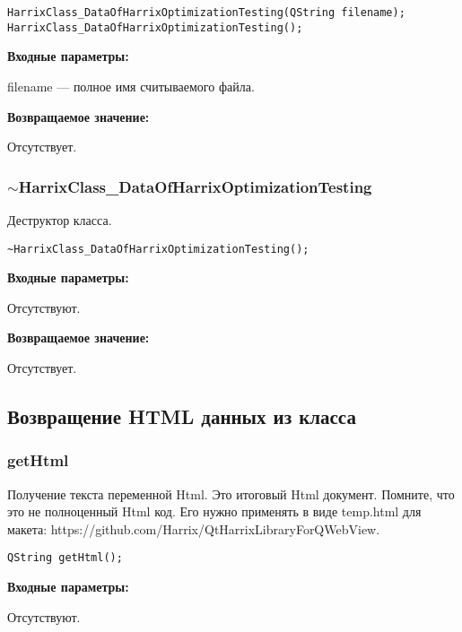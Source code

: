 \begin{lstlisting}[label=code_syntax_HarrixClass_DataOfHarrixOptimizationTesting,caption=Синтаксис]
HarrixClass_DataOfHarrixOptimizationTesting(QString filename);
HarrixClass_DataOfHarrixOptimizationTesting();
\end{lstlisting}

\textbf{Входные параметры:}

filename --- полное имя считываемого файла.

\textbf{Возвращаемое значение:}

Отсутствует.


\subsubsection{$\sim$HarrixClass\_DataOfHarrixOptimizationTesting}\label{tildaHarrixClass_DataOfHarrixOptimizationTesting}

Деструктор класса.


\begin{lstlisting}[label=code_syntax_tildaHarrixClass_DataOfHarrixOptimizationTesting,caption=Синтаксис]
~HarrixClass_DataOfHarrixOptimizationTesting();
\end{lstlisting}

\textbf{Входные параметры:}

Отсутствуют.

\textbf{Возвращаемое значение:}

Отсутствует.


\subsection{Возвращение HTML данных из класса}

\subsubsection{getHtml}\label{getHtml}

Получение текста переменной Html. Это итоговый Html документ. Помните, что это не полноценный Html код. Его нужно применять в виде temp.html для макета:      https://github.com/Harrix/QtHarrixLibraryForQWebView.


\begin{lstlisting}[label=code_syntax_getHtml,caption=Синтаксис]
QString getHtml();
\end{lstlisting}

\textbf{Входные параметры:}

Отсутствуют.

